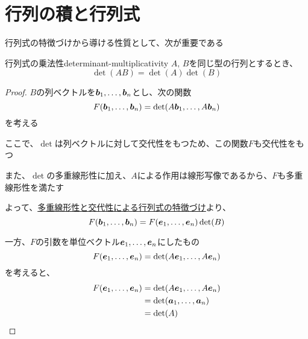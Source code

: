 \documentclass[../../../topic_linear-algebra]{subfiles}
\begin{document}
\sectionline
\section{行列の積と行列式}

行列式の特徴づけから導ける性質として、次が重要である

\begin{theorem}{行列式の乗法性}{determinant-multiplicativity}
  $A,\,B$を同じ型の行列とするとき、
  \begin{equation*}
    \det(AB) = \det(A) \det(B)
  \end{equation*}
\end{theorem}

\begin{proof}
  $B$の列ベクトルを$\vb*{b}_1, \ldots, \vb*{b}_n$とし、次の関数
  \begin{equation*}
    F(\vb*{b}_1, \ldots, \vb*{b}_n) = \det(A\vb*{b}_1, \ldots, A\vb*{b}_n)
  \end{equation*}
  を考える

  ここで、$\det$は列ベクトルに対して交代性をもつため、この関数$F$も交代性をもつ

  また、$\det$の多重線形性に加え、$A$による作用は線形写像であるから、$F$も多重線形性を満たす

  \br

  よって、\hyperref[thm:determinant-characterization-by-properties]{多重線形性と交代性による行列式の特徴づけ}より、
  \begin{equation*}
    F(\vb*{b}_1, \ldots, \vb*{b}_n) = F(\vb*{e}_1, \ldots, \vb*{e}_n) \det(B)
  \end{equation*}

  \br

  一方、$F$の引数を単位ベクトル$\vb*{e}_1, \ldots, \vb*{e}_n$にしたもの
  \begin{equation*}
    F(\vb*{e}_1, \ldots, \vb*{e}_n) = \det(A\vb*{e}_1, \ldots, A\vb*{e}_n)
  \end{equation*}
  を考えると、
  \begin{align*}
    F(\vb*{e}_1, \ldots, \vb*{e}_n) & = \det(A\vb*{e}_1, \ldots, A\vb*{e}_n) \\
                                    & = \det(\vb*{a}_1, \ldots, \vb*{a}_n)   \\
                                    & = \det(A)
  \end{align*}

  \br


\end{proof}
\end{document}

